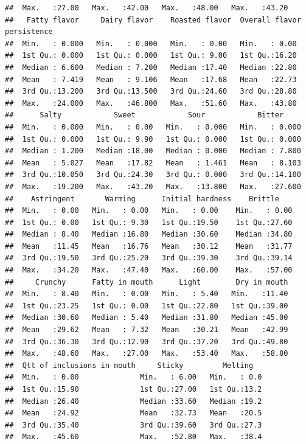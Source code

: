 \documentclass[
]{book}
\begin{document}
\begin{verbatim}
##  Max.   :27.00   Max.   :42.00   Max.   :48.00   Max.   :43.20   
##   Fatty flavor     Dairy flavor    Roasted flavor  Overall flavor persistence
##  Min.   : 0.000   Min.   : 0.000   Min.   : 0.00   Min.   : 0.00             
##  1st Qu.: 0.000   1st Qu.: 0.000   1st Qu.: 9.00   1st Qu.:16.20             
##  Median : 6.600   Median : 7.200   Median :17.40   Median :22.80             
##  Mean   : 7.419   Mean   : 9.106   Mean   :17.68   Mean   :22.73             
##  3rd Qu.:13.200   3rd Qu.:13.500   3rd Qu.:24.60   3rd Qu.:28.80             
##  Max.   :24.000   Max.   :46.800   Max.   :51.60   Max.   :43.80             
##      Salty            Sweet            Sour            Bitter      
##  Min.   : 0.000   Min.   : 0.00   Min.   : 0.000   Min.   : 0.000  
##  1st Qu.: 0.000   1st Qu.: 9.90   1st Qu.: 0.000   1st Qu.: 0.000  
##  Median : 1.200   Median :18.00   Median : 0.000   Median : 7.800  
##  Mean   : 5.027   Mean   :17.82   Mean   : 1.461   Mean   : 8.103  
##  3rd Qu.:10.050   3rd Qu.:24.30   3rd Qu.: 0.000   3rd Qu.:14.100  
##  Max.   :19.200   Max.   :43.20   Max.   :13.800   Max.   :27.600  
##    Astringent       Warming      Initial hardness    Brittle     
##  Min.   : 0.00   Min.   : 0.00   Min.   : 0.00    Min.   : 0.00  
##  1st Qu.: 0.00   1st Qu.: 9.30   1st Qu.:19.50    1st Qu.:27.60  
##  Median : 8.40   Median :16.80   Median :30.60    Median :34.80  
##  Mean   :11.45   Mean   :16.76   Mean   :30.12    Mean   :31.77  
##  3rd Qu.:19.50   3rd Qu.:25.20   3rd Qu.:39.30    3rd Qu.:39.14  
##  Max.   :34.20   Max.   :47.40   Max.   :60.00    Max.   :57.00  
##     Crunchy      Fatty in mouth      Light        Dry in mouth  
##  Min.   : 8.40   Min.   : 0.00   Min.   : 5.40   Min.   :11.40  
##  1st Qu.:23.25   1st Qu.: 0.00   1st Qu.:22.80   1st Qu.:39.00  
##  Median :30.60   Median : 5.40   Median :31.80   Median :45.00  
##  Mean   :29.62   Mean   : 7.32   Mean   :30.21   Mean   :42.99  
##  3rd Qu.:36.30   3rd Qu.:12.90   3rd Qu.:37.20   3rd Qu.:49.80  
##  Max.   :48.60   Max.   :27.00   Max.   :53.40   Max.   :58.80  
##  Qtt of inclusions in mouth     Sticky         Melting    
##  Min.   : 0.00              Min.   : 6.00   Min.   : 0.0  
##  1st Qu.:15.90              1st Qu.:27.00   1st Qu.:13.2  
##  Median :26.40              Median :33.60   Median :19.2  
##  Mean   :24.92              Mean   :32.73   Mean   :20.5  
##  3rd Qu.:35.40              3rd Qu.:39.60   3rd Qu.:27.3  
##  Max.   :45.60              Max.   :52.80   Max.   :38.4
\end{verbatim}
\end{document}
